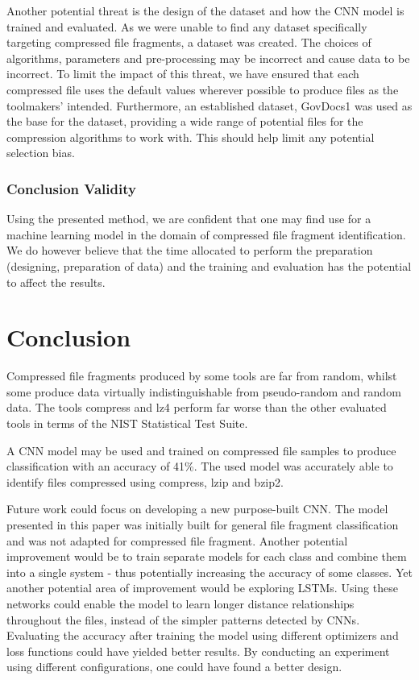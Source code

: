 \documentclass[conference]{IEEEtran}
\begin{document}
Another potential threat is the design of the dataset and how the CNN model is trained and evaluated. As we were unable to find any dataset specifically targeting compressed file fragments, a dataset was created. The choices of algorithms, parameters and pre-processing may be incorrect and cause data to be incorrect. To limit the impact of this threat, we have ensured that each compressed file uses the default values wherever possible to produce files as the toolmakers' intended. Furthermore, an established dataset, GovDocs1 was used as the base for the dataset, providing a wide range of potential files for the compression algorithms to work with. This should help limit any potential selection bias.

\subsubsection{Conclusion Validity}
\label{section:conclusion-validity}

Using the presented method, we are confident that one may find use for a machine learning model in the domain of compressed file fragment identification. We do however believe that the time allocated to perform the preparation (designing, preparation of data) and the training and evaluation has the potential to affect the results.

\newpage
\section{Conclusion}

Compressed file fragments produced by some tools are far from random, whilst some produce data virtually indistinguishable from pseudo-random and random data. The tools compress and lz4 perform far worse than the other evaluated tools in terms of the NIST Statistical Test Suite.

A CNN model may be used and trained on compressed file samples to produce classification with an accuracy of 41\%. The used model was accurately able to identify files compressed using compress, lzip and bzip2.

Future work could focus on developing a new purpose-built CNN. The model presented in this paper was initially built for general file fragment classification and was not adapted for compressed file fragment\cite{chen2018}. Another potential improvement would be to train separate models for each class and combine them into a single system - thus potentially increasing the accuracy of some classes. Yet another potential area of improvement would be exploring LSTMs. Using these networks could enable the model to learn longer distance relationships throughout the files, instead of the simpler patterns detected by CNNs\cite{LE2018S118}. Evaluating the accuracy after training the model using different optimizers and loss functions could have yielded better results. By conducting an experiment using different configurations, one could have found a better design.
\end{document}
